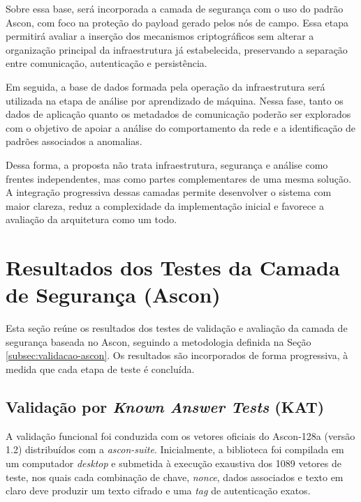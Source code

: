 Sobre essa base, será incorporada a camada de segurança com o uso do padrão Ascon, com foco na proteção do payload gerado pelos nós de campo. Essa etapa permitirá avaliar a inserção dos mecanismos criptográficos sem alterar a organização principal da infraestrutura já estabelecida, preservando a separação entre comunicação, autenticação e persistência.

Em seguida, a base de dados formada pela operação da infraestrutura será utilizada na etapa de análise por aprendizado de máquina. Nessa fase, tanto os dados de aplicação quanto os metadados de comunicação poderão ser explorados com o objetivo de apoiar a análise do comportamento da rede e a identificação de padrões associados a anomalias.

Dessa forma, a proposta não trata infraestrutura, segurança e análise como frentes independentes, mas como partes complementares de uma mesma solução. A integração progressiva dessas camadas permite desenvolver o sistema com maior clareza, reduz a complexidade da implementação inicial e favorece a avaliação da arquitetura como um todo.


\section{Resultados dos Testes da Camada de Segurança (Ascon)}

Esta seção reúne os resultados dos testes de validação e avaliação da camada de segurança baseada no Ascon, seguindo a metodologia definida na Seção \ref{subsec:validacao-ascon}. Os resultados são incorporados de forma progressiva, à medida que cada etapa de teste é concluída.


\subsection{Validação por \textit{Known Answer Tests} (KAT)}

A validação funcional foi conduzida com os vetores oficiais do Ascon-128a (versão 1.2) distribuídos com a \textit{ascon-suite}. Inicialmente, a biblioteca foi compilada em um computador \textit{desktop} e submetida à execução exaustiva dos 1089 vetores de teste, nos quais cada combinação de chave, \textit{nonce}, dados associados e texto em claro deve produzir um texto cifrado e uma \textit{tag} de autenticação exatos.

